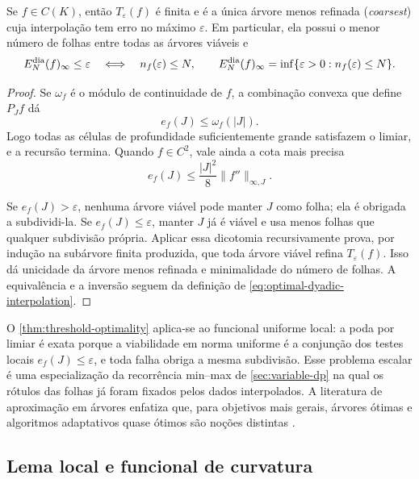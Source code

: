 \begin{theorem}
\label{thm:threshold-optimality}
Se $f\in C(K)$, então $T_\varepsilon(f)$ é finita e é a única árvore
menos refinada (\emph{coarsest}) cuja interpolação tem erro no máximo $\varepsilon$. Em particular,
ela possui o menor número de folhas entre todas as árvores viáveis e
\begin{equation}
 E_N^{\rm dia}(f)_\infty\le\varepsilon
 \quad\Longleftrightarrow\quad
 n_f(\varepsilon)\le N,
 \qquad
 E_N^{\rm dia}(f)_\infty
 =\inf\{\varepsilon>0:n_f(\varepsilon)\le N\}.
 \label{eq:threshold-inversion}
\end{equation}
\end{theorem}

\begin{proof}
Se $\omega_f$ é o módulo de continuidade de $f$, a combinação convexa que
define $P_Jf$ dá
\[
 e_f(J)\le\omega_f(|J|).
\]
Logo todas as células de profundidade suficientemente grande satisfazem o
limiar, e a recursão termina. Quando $f\in C^2$, vale ainda a cota mais
precisa
\begin{equation}
 e_f(J)\le \frac{|J|^2}{8}\|f''\|_{\infty,J}.
 \label{eq:local-upper-basic}
\end{equation}

Se $e_f(J)>\varepsilon$, nenhuma árvore viável pode manter $J$ como folha;
ela é obrigada a subdividi-la. Se $e_f(J)\le\varepsilon$, manter $J$ já é
viável e usa menos folhas que qualquer subdivisão própria. Aplicar essa
dicotomia recursivamente prova, por indução na subárvore finita produzida,
que toda árvore viável refina $T_\varepsilon(f)$. Isso dá unicidade da árvore menos
refinada e minimalidade do número de folhas. A equivalência e a inversão seguem da
definição de \eqref{eq:optimal-dyadic-interpolation}.
\end{proof}

O \cref{thm:threshold-optimality} aplica-se ao funcional uniforme local: a
poda por limiar é exata porque a
viabilidade em norma uniforme é a conjunção dos testes locais
$e_f(J)\le\varepsilon$, e toda falha obriga a mesma subdivisão. Esse problema
escalar é uma especialização da recorrência min--max de
\cref{sec:variable-dp} na qual os
rótulos das folhas já foram fixados pelos dados interpolados. A literatura de
aproximação em árvores enfatiza que, para objetivos mais gerais, árvores
ótimas e algoritmos adaptativos quase ótimos são noções distintas
\citep{cohen2001,binev2004}.

\subsection{Lema local e funcional de curvatura}

